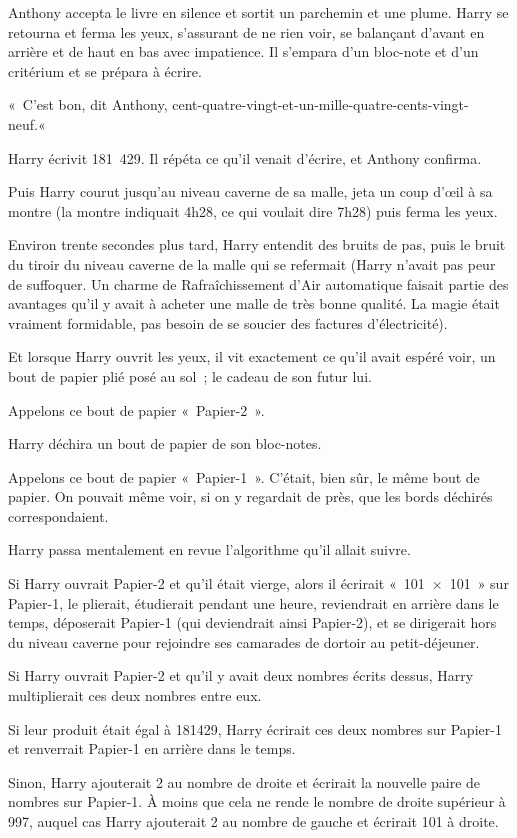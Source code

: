 Anthony accepta le livre en silence et sortit un parchemin et une plume. Harry se retourna et ferma les yeux, s'assurant de ne rien voir, se balançant d'avant en arrière et de haut en bas avec impatience. Il s'empara d'un bloc-note et d'un critérium et se prépara à écrire.

«~C'est bon, dit Anthony, cent-quatre-vingt-et-un-mille-quatre-cents-vingt-neuf.«~

Harry écrivit 181~429. Il répéta ce qu'il venait d'écrire, et Anthony confirma.

Puis Harry courut jusqu'au niveau caverne de sa malle, jeta un coup d'œil à sa montre (la montre indiquait 4h28, ce qui voulait dire 7h28) puis ferma les yeux.

Environ trente secondes plus tard, Harry entendit des bruits de pas, puis le bruit du tiroir du niveau caverne de la malle qui se refermait (Harry n'avait pas peur de suffoquer. Un charme de Rafraîchissement d'Air automatique faisait partie des avantages qu'il y avait à acheter une malle de très bonne qualité. La magie était vraiment formidable, pas besoin de se soucier des factures d'électricité).

Et lorsque Harry ouvrit les yeux, il vit exactement ce qu'il avait espéré voir, un bout de papier plié posé au sol~; le cadeau de son futur lui.

Appelons ce bout de papier «~Papier-2~».

Harry déchira un bout de papier de son bloc-notes.

Appelons ce bout de papier «~Papier-1~». C'était, bien sûr, le même bout de papier. On pouvait même voir, si on y regardait de près, que les bords déchirés correspondaient.

Harry passa mentalement en revue l'algorithme qu'il allait suivre.

Si Harry ouvrait Papier-2 et qu'il était vierge, alors il écrirait «~101~$\times$~101~» sur Papier-1, le plierait, étudierait pendant une heure, reviendrait en arrière dans le temps, déposerait Papier-1 (qui deviendrait ainsi Papier-2), et se dirigerait hors du niveau caverne pour rejoindre ses camarades de dortoir au petit-déjeuner.

Si Harry ouvrait Papier-2 et qu'il y avait deux nombres écrits dessus, Harry multiplierait ces deux nombres entre eux.

Si leur produit était égal à 181429, Harry écrirait ces deux nombres sur Papier-1 et renverrait Papier-1 en arrière dans le temps.

Sinon, Harry ajouterait 2 au nombre de droite et écrirait la nouvelle paire de nombres sur Papier-1. À moins que cela ne rende le nombre de droite supérieur à 997, auquel cas Harry ajouterait 2 au nombre de gauche et écrirait 101 à droite.

